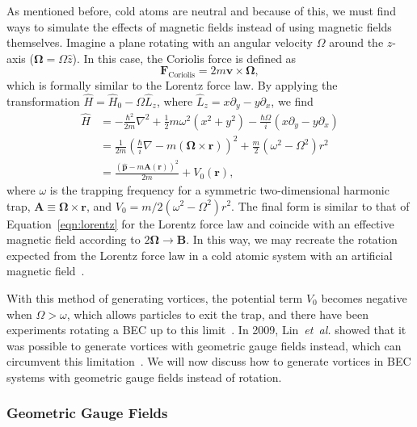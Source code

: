 As mentioned before, cold atoms are neutral and because of this, we must find ways to simulate the effects of magnetic fields instead of using magnetic fields themselves.
Imagine a plane rotating with an angular velocity $\Omega$ around the $z$-axis ($\mathbf{\Omega} = \Omega \hat z$). 
In this case, the Coriolis force is defined as
\begin{equation}
\mathbf{F}_{\text{Coriolis}} = 2m \mathbf{v} \times \mathbf{\Omega},
\end{equation}
which is formally similar to the Lorentz force law.
By applying the transformation $\hat H = \hat H_0 - \Omega \hat L_z$, where $\hat L_z = x\partial_y - y\partial_x$, we find~\cite{Bhat2008}
\begin{equation}
\begin{split}
\hat H &= -\frac{\hbar^2}{2m}\nabla^2 + \frac 1 2 m \omega^2(x^2 + y^2) - \frac{\hbar \Omega}{i}(x\partial_y - y\partial_x) \\
 &= \frac{1}{2m}\left(\frac{\hbar}{i}\nabla - m(\mathbf{\Omega} \times \mathbf{r})\right)^2 + \frac m 2 \left( \omega^2 - \Omega^2 \right)r^2 \\
 &= \frac{(\hat{\mathbf{p}}-m\mathbf{A}(\mathbf{r}))^2}{2m}+ V_0(\mathbf{r}),
\end{split}
\end{equation}
where $\omega$ is the trapping frequency for a symmetric two-dimensional harmonic trap, $\mathbf{A} \equiv \mathbf{\Omega} \times \mathbf{r}$, and $V_0 = m/2 \left( \omega^2 - \Omega^2 \right)r^2$.
The final form is similar to that of Equation~\eqref{eqn:lorentz} for the Lorentz force law and coincide with an effective magnetic field according to $2 \mathbf \Omega \rightarrow \mathbf B$.
In this way, we may recreate the rotation expected from the Lorentz force law in a cold atomic system with an artificial magnetic field~\cite{Peshkin1989, Madison2000, Abo-Shaeer2001}.

With this method of generating vortices, the potential term $V_0$ becomes negative when $\Omega > \omega$, which allows particles to exit the trap, and there have been experiments rotating a BEC up to this limit~\cite{Schweikhard2004}.
In 2009, Lin~\textit{et~al.} showed that it was possible to generate vortices with geometric gauge fields instead, which can circumvent this limitation~\cite{Lin2009}.
We will now discuss how to generate vortices in BEC systems with geometric gauge fields instead of rotation.

\subsubsection{Geometric Gauge Fields}
\label{sec:geom}

